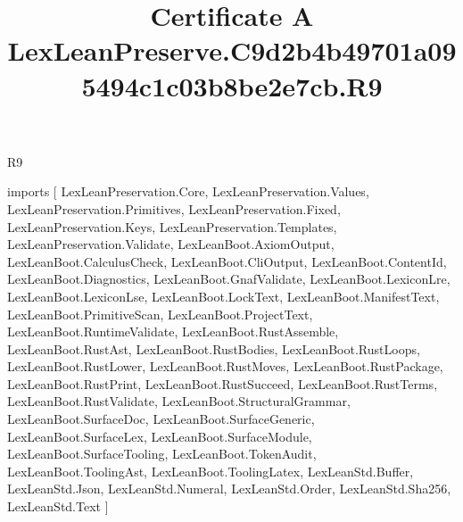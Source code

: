 \begin{lexlean}{R9}
\title{Certificate A LexLeanPreserve.C9d2b4b49701a095494c1c03b8be2e7cb.R9}
\begin{coremodule}
imports [
  LexLeanPreservation.Core,
  LexLeanPreservation.Values,
  LexLeanPreservation.Primitives,
  LexLeanPreservation.Fixed,
  LexLeanPreservation.Keys,
  LexLeanPreservation.Templates,
  LexLeanPreservation.Validate,
  LexLeanBoot.AxiomOutput,
  LexLeanBoot.CalculusCheck,
  LexLeanBoot.CliOutput,
  LexLeanBoot.ContentId,
  LexLeanBoot.Diagnostics,
  LexLeanBoot.GnafValidate,
  LexLeanBoot.LexiconLre,
  LexLeanBoot.LexiconLse,
  LexLeanBoot.LockText,
  LexLeanBoot.ManifestText,
  LexLeanBoot.PrimitiveScan,
  LexLeanBoot.ProjectText,
  LexLeanBoot.RuntimeValidate,
  LexLeanBoot.RustAssemble,
  LexLeanBoot.RustAst,
  LexLeanBoot.RustBodies,
  LexLeanBoot.RustLoops,
  LexLeanBoot.RustLower,
  LexLeanBoot.RustMoves,
  LexLeanBoot.RustPackage,
  LexLeanBoot.RustPrint,
  LexLeanBoot.RustSucceed,
  LexLeanBoot.RustTerms,
  LexLeanBoot.RustValidate,
  LexLeanBoot.StructuralGrammar,
  LexLeanBoot.SurfaceDoc,
  LexLeanBoot.SurfaceGeneric,
  LexLeanBoot.SurfaceLex,
  LexLeanBoot.SurfaceModule,
  LexLeanBoot.SurfaceTooling,
  LexLeanBoot.TokenAudit,
  LexLeanBoot.ToolingAst,
  LexLeanBoot.ToolingLatex,
  LexLeanStd.Buffer,
  LexLeanStd.Json,
  LexLeanStd.Numeral,
  LexLeanStd.Order,
  LexLeanStd.Sha256,
  LexLeanStd.Text
]


\end{coremodule}
\end{lexlean}

